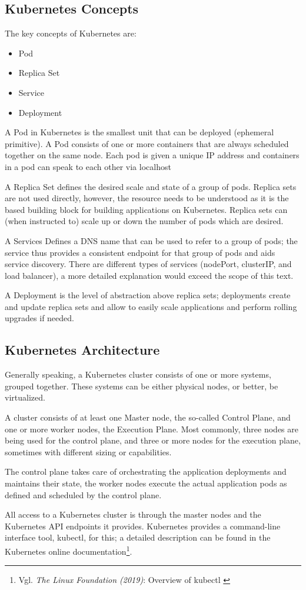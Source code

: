 \subsection{Kubernetes Concepts}

The key concepts of Kubernetes are:
\begin{itemize}
\item Pod
\item Replica Set
\item Service
\item Deployment
\end{itemize}

A Pod in Kubernetes is the smallest unit that can be deployed (ephemeral primitive). A Pod consists of one or more containers that are always scheduled together on the same node. Each pod is given a unique IP address and containers in a pod can speak to each other via localhost

A Replica Set defines the desired scale and state of a group of pods. Replica sets are not used directly, however, the resource needs to be understood as it is the based building block for building applications on Kubernetes. Replica sets can (when instructed to) scale up or down the number of pods which are desired.

A Services Defines a DNS name that can be used to refer to a group of pods; the service thus provides a consistent endpoint for that group of pods and aids service discovery. There are different types of services (nodePort, clusterIP, and load balancer), a more detailed explanation would exceed the scope of this text.

A Deployment is the level of abstraction above replica sets; deployments create and update replica sets and allow to easily scale applications and perform rolling upgrades if needed.

\subsection{Kubernetes Architecture}

Generally speaking, a Kubernetes cluster consists of one or more systems, grouped together. These systems can be either physical nodes, or better, be virtualized.

A cluster consists of at least one Master node, the so-called Control Plane, and one or more worker nodes, the Execution Plane. Most commonly, three nodes are being used for the control plane, and three or more nodes for the execution plane, sometimes with different sizing or capabilities.

The control plane takes care of orchestrating the application deployments and maintains their state, the worker nodes execute the actual application pods as defined and scheduled by the control plane.

All access to a Kubernetes cluster is through the master nodes and the Kubernetes API endpoints it provides. Kubernetes provides a command-line interface tool, kubectl, for this; a detailed description can be found in the Kubernetes online documentation\footnote{Vgl. \textit{The Linux Foundation (2019)}: Overview of kubectl \cite{kubectl}}.

